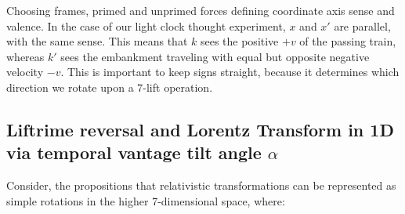 \documentclass{article}
\begin{document}
\noindent Choosing frames, primed and unprimed forces defining coordinate axis sense and valence. In the case of our light clock thought experiment, $x$ and $x'$ are parallel, with the same sense. This means that $k$ sees the positive $+v$ of the passing train, whereas $k'$ sees the embankment traveling with equal but opposite negative velocity $-v$. This is important to keep signs straight, because it determines which direction we rotate upon a 7-lift operation.\\

\subsection*{Liftrime reversal and Lorentz Transform in 1D via temporal vantage tilt angle $\alpha$}

Consider, the propositions that relativistic transformations can be represented as simple rotations in the higher 7-dimensional space, where:\\
\\
\\[-2mm]
\end{document}
